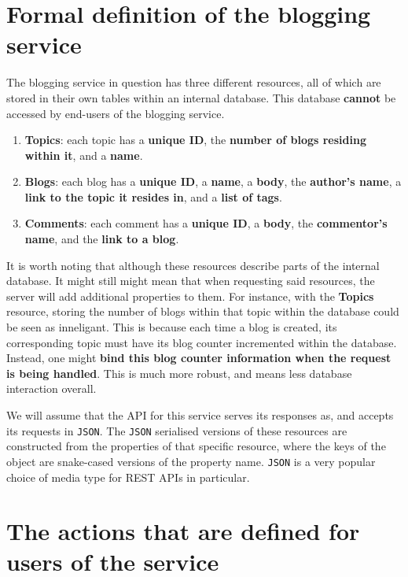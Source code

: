 \documentclass[]{full}
\theoremstyle{definition}
\begin{document}
\section{Formal definition of the blogging service}

The blogging service in question has three different resources, all of which are stored in their own tables within an internal database. This database \textbf{cannot} be accessed by end-users of the blogging service.

\begin{enumerate}
    \item \textbf{Topics}: each topic has a \textbf{unique ID}, the \textbf{number of blogs residing within it}, and a \textbf{name}.
    \item \textbf{Blogs}: each blog has a \textbf{unique ID}, a \textbf{name}, a \textbf{body}, the \textbf{author's name}, a \textbf{link to the topic it resides in}, and a \textbf{list of tags}.
    \item \textbf{Comments}: each comment has a \textbf{unique ID}, a \textbf{body}, the \textbf{commentor's name}, and the \textbf{link to a blog}.
\end{enumerate}

It is worth noting that although these resources describe parts of the internal database. It might still might mean that when requesting said resources, the server will add additional properties to them. For instance, with the \textbf{Topics} resource, storing the number of blogs within that topic within the database could be seen as inneligant. This is because each time a blog is created, its corresponding topic must have its blog counter incremented within the database. Instead, one might \textbf{bind this blog counter information when the request is being handled}. This is much more robust, and means less database interaction overall.

We will assume that the API for this service serves its responses as, and accepts its requests in \verb|JSON|. The \verb|JSON| serialised versions of these resources are constructed from the properties of that specific resource, where the keys of the object are snake-cased versions of the property name. \verb|JSON| is a very popular choice of media type for REST APIs in particular.

\section{The actions that are defined for users of the service}
\end{document}
